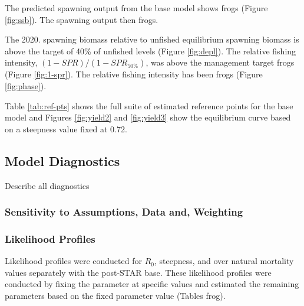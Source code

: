 \documentclass[11pt,
  english,
  a4paper,
]{article}
\begin{document}
The predicted spawning output from the base model shows frogs (Figure \ref{fig:ssb}). The spawning output then frogs.

The 2020. spawning biomass relative to unfished equilibrium spawning biomass is above the target of 40\% of unfished levels (Figure \ref{fig:depl}). The relative fishing intensity, {\((1-SPR)/(1-SPR_{50\%})\)\leavevmode\tagmcend\tagstructend}, was above the management target frogs (Figure \ref{fig:1-spr}). The relative fishing intensity has been frogs (Figure \ref{fig:phase}).

Table \ref{tab:ref-pts} shows the full suite of estimated reference points for the base model and Figures \ref{fig:yield2} and \ref{fig:yield3} show the equilibrium curve based on a steepness value fixed at 0.72.


\hypertarget{model-diagnostics}{%
\subsection{Model Diagnostics}\label{model-diagnostics}}

\leavevmode\tagmcend\tagstructend

Describe all diagnostics


\hypertarget{sensitivity-to-assumptions-data-and-weighting}{%
\subsubsection{Sensitivity to Assumptions, Data and, Weighting}\label{sensitivity-to-assumptions-data-and-weighting}}

\leavevmode\tagmcend\tagstructend


\hypertarget{likelihood-profiles}{%
\subsubsection{Likelihood Profiles}\label{likelihood-profiles}}

\leavevmode\tagmcend\tagstructend

Likelihood profiles were conducted for {\(R_0\)\leavevmode\tagmcend\tagstructend}, steepness, and over natural mortality values separately with the post-STAR base. These likelihood profiles were conducted by fixing the parameter at specific values and estimated the remaining parameters based on the fixed parameter value (Tables frog).
\end{document}
